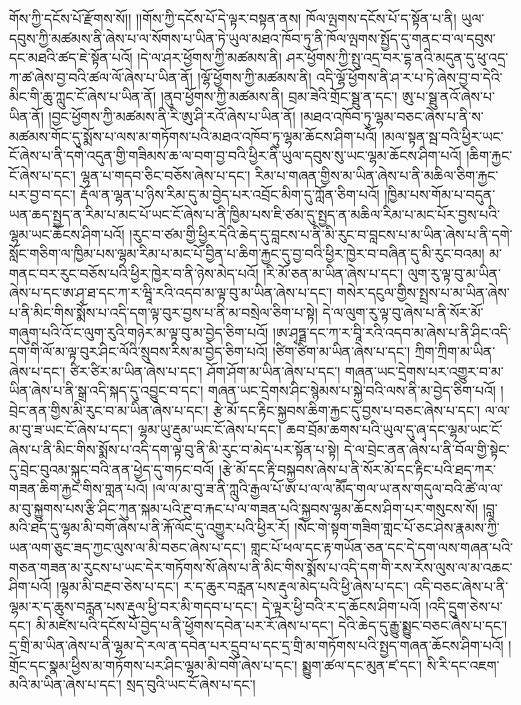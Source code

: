 གོས་ཀྱི་དངོས་པོ་རྫོགས་སོ།། །།གོས་ཀྱི་དངོས་པོ་དེ་ལྟར་བསྟན་ནས། ཁོལ་ལྤགས་དངོས་པོ་ད་སྟོན་པ་ནི། ཡུལ་དབུས་ཀྱི་མཚམས་ནི་ཞེས་པ་ལ་སོགས་པ་ཡིན་ཏེ་ཡུལ་མཐའ་ཁོབ་ཏུ་ནི་ཁོལ་ལྤགས་སྤྱོད་དུ་གནང་བ་ལ་དབུས་དང་མཐའི་ཚད་ཇེ་སྟོན་པའོ། །དེ་ལ་ཤར་ཕྱོགས་ཀྱི་མཚམས་ནི། ཤར་ཕྱོགས་ཀྱི་སྤུ་འདྲ་བར་དྷ་ནའི་མདུན་དུ་ཕུ་འདྲ་ཀ་ཚ་ཞེས་བྱ་བའི་ཚལ་ལོ་ཞེས་པ་ཡིན་ནོ། །ལྷོ་ཕྱོགས་ཀྱི་མཚམས་ནི། འདི་ལྷོ་ཕྱོགས་ནི་ཤ་ར་པ་ཏེ་ཞེས་བྱ་བ་དེའི་མིང་གི་ཆུ་ཀླུང་ངོ་ཞེས་པ་ཡིན་ནོ། །ནུབ་ཕྱོགས་ཀྱི་མཚམས་ནི། བྲམ་ཟེའི་གྲོང་སྠུ་ན་དང་། ཨུ་པ་སྠུ་ནའོ་ཞེས་པ་ཡིན་ནོ། །བྱང་ཕྱོགས་ཀྱི་མཚམས་ནི་རི་ཨུ་ཤི་རའོ་ཞེས་པ་ཡིན་ནོ། །མཐའ་འཁོབ་ཏུ་ལྷམ་བཅང་ཞེས་པ་ནི་ས་མཚམས་གོང་དུ་སྨོས་པ་ལས་མ་གཏོགས་པའི་མཐའ་འཁོབ་ཏུ་ལྷམ་ཆོངས་ཤིག་པའོ། །མལ་སྟན་སྦ་བའི་ཕྱིར་ཡང་ངོ་ཞེས་པ་ནི་དགེ་འདུན་གྱི་གཟིམས་ཆ་ལ་བག་བྱ་བའི་ཕྱིར་ནི་ཡུལ་དབུས་སུ་ཡང་ལྷམ་ཆོངས་ཤིག་པའོ། །ཆིག་རྐྱང་ངོ་ཞེས་པ་དང་། ལྷན་པ་གདབ་ཅིང་བཅོས་ཞེས་པ་དང་། རིམ་པ་གཞན་གྱིས་མ་ཡིན་ཞེས་པ་ནི་མཆིལ་ཅིག་རྐྱང་པར་བྱ་བ་དང་། རྡོལ་ན་ལྷན་པ་ཉིས་རིམ་དུ་མ་བྱེད་པར་འབྲོང་མིག་དུ་ཀློན་ཅིག་པའོ། །ཁྱིམ་པས་གོམ་པ་བདུན་ཡན་ཆད་སྤྱད་ན་རིམ་པ་མང་པོ་ཡང་ངོ་ཞེས་པ་ནི་ཁྱིམ་པས་ཇི་ཙམ་དུ་སྤྱད་ན་མཆིལ་རིམ་པ་མང་པོར་བྱས་པའི་ལྷམ་ཡང་ཆོངས་ཤིག་པའོ། །རུང་བ་ཙམ་གྱི་ཕྱིར་དེའི་ཆེད་དུ་བླངས་པ་ནི་མི་རུང་བ་བླངས་པ་མ་ཡིན་ཞེས་པ་ནི་དགེ་སློང་གཅིག་ལ་ཁྱིམ་པས་ལྷམ་རིམ་པ་མང་པོ་བྱིན་པ་ཆིག་རྐྱང་དུ་བྱ་བའི་ཕྱིར་ཁྱེར་བ་བཞིན་དུ་མི་རུང་བའམ། མ་གནང་བར་རུང་བཅོས་པའི་ཕྱིར་ཁྱེར་བ་ནི་ཉེས་མེད་པའོ། །རི་མོ་ཅན་མ་ཡིན་ཞེས་པ་དང་། ལུག་རུ་ལྟ་བུ་མ་ཡིན་ཞེས་པ་དང་ཨ་ཤྭ་ཐ་དང་ཀ་ར་ཝཱི་རའི་འདབ་མ་ལྟ་བུ་མ་ཡིན་ཞེས་པ་དང་། གསེར་དངུལ་གྱིས་སྤྲས་པ་མ་ཡིན་ཞེས་པ་ནི་མིང་གིས་སྨོས་པ་འདི་དག་ལྟ་བུར་བྱས་པ་ནི་མ་བསྲེལ་ཅིག་པ་སྟེ། དེ་ལ་ལུག་རུ་ལྟ་བུ་ཞེས་པ་ནི་སོར་མོ་གཞུག་པའི་འོ་ང་ལུག་རུའི་གཉེར་མ་ལྟ་བུ་མ་བྱེད་ཅིག་པའོ། །ཨ་ཤྭཏྠ་དང་ཀ་ར་བཱི་རའི་འདབ་མ་ཞེས་པ་ནི་ཤིང་འདི་དག་གི་ལོ་མ་ལྟ་བུར་ཤིང་ལོའི་སྲུབས་རིས་མ་བྱེད་ཅིག་པའོ། །ཙིག་ཙིག་མ་ཡིན་ཞེས་པ་དང་། ཀྲིག་ཀྲིག་མ་ཡིན་ཞེས་པ་དང་། ཙིར་ཙིར་མ་ཡིན་ཞེས་པ་དང་། ཤོག་ཤོག་མ་ཡིན་ཞེས་པ་དང་། གཞན་ཡང་དྲེགས་པར་འགྱུར་བ་མ་ཡིན་ཞེས་པ་ནི་སྒྲ་འདི་སྐད་དུ་འབྱུང་བ་དང་། གཞན་ཡང་དྲེགས་ཤིང་སྙེམས་པ་སྐྱེ་བའི་ལས་ནི་མ་བྱེད་ཅིག་པའོ། །བྲེང་ནན་གྱིས་མི་རུང་བ་མ་ཡིན་ཞེས་པ་དང་། རྩེ་མོ་དང་རྟིང་སྐྱབས་ཆིག་རྐྱང་དུ་བྱས་པ་བཅང་ཞེས་པ་དང་། ལ་ལ་མ་བུ་ཟ་ཡང་ངོ་ཞེས་པ་དང་། ལྷམ་ཡུ་རྡུམ་ཡང་ངོ་ཞེས་པ་དང་། ཆབ་བྲོམ་ཆགས་པའི་ཡུལ་དུ་ཞྭ་དང་ལྷམ་ཡང་ངོ་ཞེས་པ་ནི་མིང་གིས་སྨོས་པ་འདི་དག་ལྟ་བུ་ནི་མི་རུང་བ་མེད་པར་སྟོན་པ་སྟེ། དེ་ལ་བྲེང་ནན་ཞེས་པ་ནི་བོལ་གྱི་སྟེང་དུ་བྲེང་བུའམ་སྐུང་བའི་ནན་ཕྱེད་དུ་གཏང་བའོ། །རྩེ་མོ་དང་རྟི་བསྐྱབས་ཞེས་པ་ནི་སོར་མོ་དང་རྟིང་པའི་ཐད་ཀར་གཟན་ཆིག་རྐྱང་གིས་གླན་པའོ། །ལ་ལ་མ་བུ་ཟ་ནི་ཀླུའི་རྒྱལ་པོ་ཨ་པ་ལ་ལ་མཽད་གལ་ཡ་ནས་གདུལ་བའི་ཚེ་ལ་ལ་མ་བུ་སྐྱུགས་པས་རྩི་ཤིང་ཀུན་སྐམ་པའི་རྔུ་བ་རྐང་པ་ལ་གཟན་པའི་སྐྱབས་ལྷམ་ཆོངས་ཤིག་པར་གསུངས་སོ། །བླ་མའི་ཐད་དུ་ལྷམ་མི་བགོ་ཞེས་པ་ནི་རྐོ་ལོང་དུ་འགྱུར་པའི་ཕྱིར་རོ། །སེང་གེ་སྟག་གཟིག་གླང་པོ་ཅང་ཤེས་རྣམས་ཀྱི་ཡན་ལག་ཅུང་ཟད་ཀྱང་ལུས་ལ་མི་བཅང་ཞེས་པ་དང་། གླང་པོ་ཕལ་དང་རྟ་གཡོན་ཅན་དང་དེ་དག་ལས་གཞན་པའི་གཅན་གཟན་མ་རུངས་པ་ཡང་དེར་གཏོགས་སོ་ཞེས་པ་ནི་མིང་གིས་སྨོས་པ་འདི་དག་གི་རས་རོས་ལུས་ལ་མ་འཆང་ཤིག་པའོ། །ལྷམ་མི་བརྔབ་ཅེས་པ་དང་། ར་ད་ཆུར་བརླན་པས་རྡུལ་མེད་པའི་ཕྱི་ཞེས་པ་དང་། འདི་བཅང་ཞེས་པ་ནི་ལྷམ་ར་ད་ཆུས་བརླན་པས་རྡུལ་ཕྱི་བར་མི་གདབ་པ་དང་། དེ་ལྟར་ཕྱི་བའི་ར་ད་ཆོངས་ཤིག་པའོ། །འདི་དྲུག་ཅེས་པ་དང་། མི་མཛེས་པའི་དངོས་པོ་བྱེད་པ་ནི་ཕྱོགས་དབེན་པར་རོ་ཞེས་པ་དང་། དེའི་ཆེད་དུ་རྒྱུ་སྨྱུང་བཅང་ཞེས་པ་དང་། དྲ་གྲི་མ་ཡིན་ཞེས་པ་ནི་ལྷམ་དེ་རལ་ན་དབེན་པར་དྲུབ་པ་དང་དྲ་གྲི་མ་གཏོགས་པའི་སྤྱད་གཞན་ཆོངས་ཤིག་པའོ། །གྲོང་དང་སྣམ་ཕྱིས་མ་གཏོགས་པར་ཤིང་ལྷམ་མི་བགོ་ཞེས་པ་དང་། སྨྱུག་ཚལ་དང་མུན་ཛ་དང་། སི་རི་དང་འཇག་མའི་མ་ཡིན་ཞེས་པ་དང་། སྲད་བུའི་ཡང་ངོ་ཞེས་པ་དང་། 